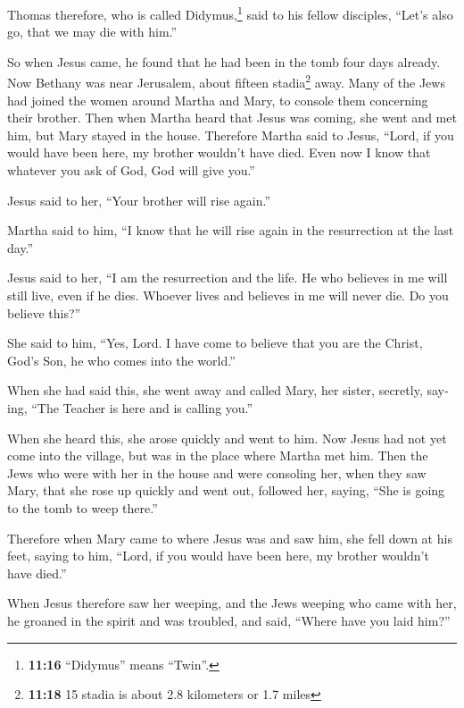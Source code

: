 \begin{paracol}{2}
\begin{otherlanguage}{english}
 Thomas therefore, who is called Didymus,\footnote{\textbf{11:16}
  ``Didymus'' means ``Twin''.} said to his fellow disciples, ``Let's
also go, that we may die with him.''

 So when Jesus came, he found that he had been in the
tomb four days already.  Now Bethany was near Jerusalem,
about fifteen stadia\footnote{\textbf{11:18} 15 stadia is about 2.8
  kilometers or 1.7 miles} away.  Many of the Jews had
joined the women around Martha and Mary, to console them concerning
their brother.  Then when Martha heard that Jesus was
coming, she went and met him, but Mary stayed in the house.
 Therefore Martha said to Jesus, ``Lord, if you would
have been here, my brother wouldn't have died.  Even now
I know that whatever you ask of God, God will give you.''

 Jesus said to her, ``Your brother will rise again.''

 Martha said to him, ``I know that he will rise again in
the resurrection at the last day.''

 Jesus said to her, ``I am the resurrection and the life.
He who believes in me will still live, even if he dies. 
Whoever lives and believes in me will never die. Do you believe this?''

 She said to him, ``Yes, Lord. I have come to believe
that you are the Christ, God's Son, he who comes into the world.''

 When she had said this, she went away and called Mary,
her sister, secretly, saying, ``The Teacher is here and is calling
you.''

 When she heard this, she arose quickly and went to him.
 Now Jesus had not yet come into the village, but was in
the place where Martha met him.  Then the Jews who were
with her in the house and were consoling her, when they saw Mary, that
she rose up quickly and went out, followed her, saying, ``She is going
to the tomb to weep there.''

 Therefore when Mary came to where Jesus was and saw him,
she fell down at his feet, saying to him, ``Lord, if you would have been
here, my brother wouldn't have died.''

 When Jesus therefore saw her weeping, and the Jews
weeping who came with her, he groaned in the spirit and was troubled,
 and said, ``Where have you laid him?''


\end{otherlanguage}
\end{paracol}
